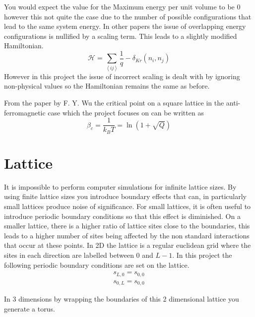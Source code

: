 You would expect the value for the Maximum energy per unit volume to be $0$ however this not quite the case due to the number of possible configurations that lead to the same system energy.
In other papers the issue of overlapping energy configurations is nullified by a scaling term. This leads to a slightly modified Hamiltonian.
\begin{equation}
\mathcal{H}=\sum_{\left\langle ij \right\rangle} \frac{1}{q} - \delta_{Kr}(n_i,n_j)
\end{equation}
However in this project the issue of incorrect scaling is dealt with by ignoring non-physical values so the Hamiltonian remains the same as before.

From the paper by F. Y. Wu the critical point on a square lattice in the anti-ferromagnetic case which the project focuses on can be written as \cite{RevModPhys.54.235}
\begin{equation}
\beta_c = \frac{1}{k_B T} = \ln\left(1+\sqrt{Q}\right)
\end{equation}

\section{Lattice}
It is impossible to perform computer simulations for infinite lattice sizes.
By using finite lattice sizes you introduce boundary effects that can, in particularly small lattices produce noise of significance.
For small lattices, it is often useful to introduce periodic boundary conditions so that this effect is diminished.
On a smaller lattice, there is a higher ratio of lattice sites close to the boundaries, this leads to a higher number of sites being affected by the non standard interactions that occur at these points.
In 2D the lattice is a regular euclidean grid where the sites in each direction are labelled between 0 and $L-1$.
In this project the following periodic boundary conditions are set on the lattice.
\begin{equation}
	\begin{split}
		s_{L,0} = s_{0,0}  \\
		s_{0,L} = s_{0,0}
	\end{split}
\end{equation}

In 3 dimensions by wrapping the boundaries of this 2 dimensional lattice you generate a torus. 

